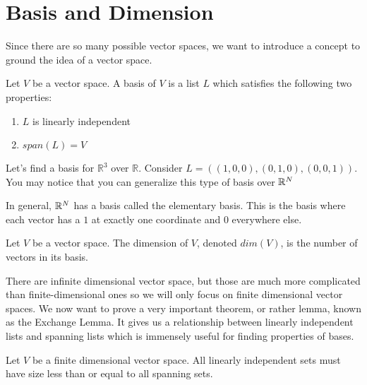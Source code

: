\section{Basis and Dimension}
Since there are so many possible vector spaces, we want to introduce a concept to ground the idea of a vector space.
\begin{definition}
    Let $V$ be a vector space. A basis of $V$ is a list $L$ which satisfies the following two properties:
    \begin{enumerate}
        \item $L$ is linearly independent
        \item $span(L)=V$
    \end{enumerate}
\end{definition}
\begin{example}
    Let's find a basis for $\mathbb{R}^3$ over $\mathbb{R}$. Consider $L=((1,0,0),(0,1,0),(0,0,1))$. You may notice that you can generalize this type of basis over $\mathbb{R}^N$
\end{example}
\begin{remark}
    In general, $\mathbb{R}^N$ has a basis called the elementary basis. This is the basis where each vector has a $1$ at exactly one coordinate and $0$ everywhere else.
\end{remark}
\begin{definition}
    Let $V$ be a vector space. The dimension of $V$, denoted $dim(V)$, is the number of vectors in its basis.
\end{definition}
There are infinite dimensional vector space, but those are much more complicated than finite-dimensional ones so we will only focus on finite dimensional vector spaces. We now want to prove a very important theorem, or rather lemma, known as the Exchange Lemma. It gives us a relationship between linearly independent lists and spanning lists which is immensely useful for finding properties of bases.
\begin{theorem}
    Let $V$ be a finite dimensional vector space. All linearly independent sets must have size less than or equal to all spanning sets.
\end{theorem}
